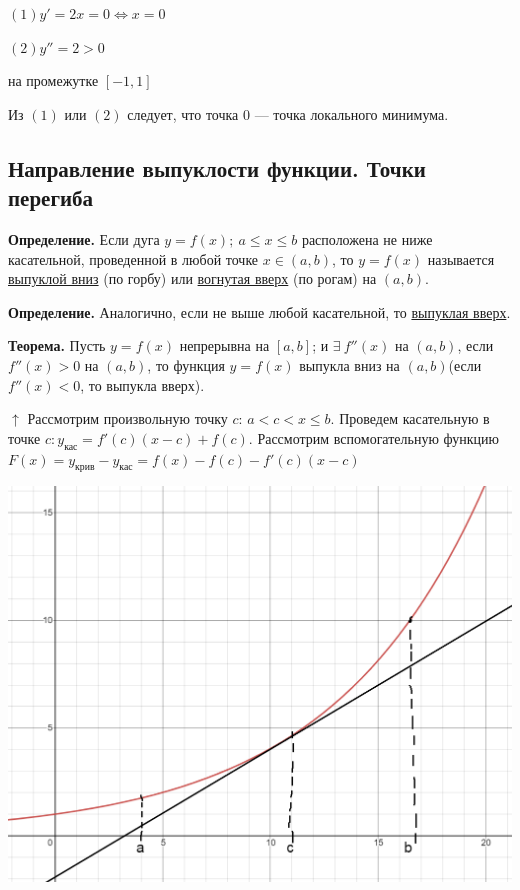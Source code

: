 \documentclass{article}
\begin{document}
\( (1) y' = 2x = 0 \Leftrightarrow x = 0 \)

\( (2) y'' = 2 > 0 \)

на промежутке \( [-1, 1] \)

Из $(1)$ или $(2)$ следует, что точка $0$ --- точка локального минимума.

\subsection{Направление выпуклости функции. Точки перегиба}

\textbf{Определение.} Если дуга \( y = f(x);\ a \leq x \leq b \) расположена не ниже касательной, проведенной в любой точке \(x \in (a, b)\), то \( y = f(x) \) называется \underline{выпуклой вниз} (по горбу) или \underline{вогнутая вверх} (по рогам) на \((a, b)\).

\textbf{Определение.} Аналогично, если не выше любой касательной, то \underline{выпуклая вверх}.

\textbf{Теорема.} Пусть \(y = f(x)\) непрерывна на \([a,b]\); и \(\exists\ f''(x)\) на \((a,b)\), если \(f''(x) > 0\) на \((a,b)\), то функция \(y = f(x)\) выпукла вниз на \((a,b)\)(если \(f''(x) < 0\), то выпукла вверх).

\(\uparrow\) Рассмотрим произвольную точку \( c \): \( a < c < x \leq b \). Проведем касательную в точке \( c: y_{\textrm{кас}} = f'(c)(x - c) + f(c) \). Рассмотрим вспомогательную функцию \( F(x) = y_{\textrm{крив}} - y_{\textrm{кас}} = f(x) - f(c) - f'(c)(x - c) \)

\includegraphics[scale=0.25]{11_1_11_2}
\end{document}
